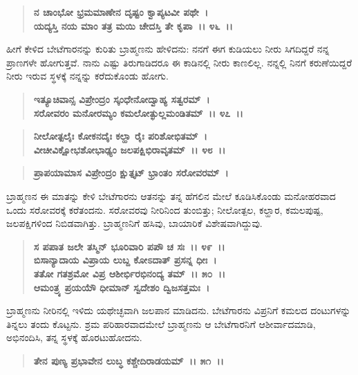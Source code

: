 \begin{verse}
\textbf{ನ ಚಾಂಭೋ ಭ್ರಮಮಾಣೇನ ದೃಷ್ಟಂ ಕ್ವಾಪ್ಯಟವೀ ಪಥೇ~।}\\\textbf{ಯದ್ಯಸ್ತಿ ನಯ ಮಾಂ ತತ್ರ ಮಯಿ ಚೇದಸ್ತಿ ತೇ ಕೃಪಾ~।। ೪೬~।।}
\end{verse}

ಹೀಗೆ ಕೇಳಿದ ಬೇಟೆಗಾರನನ್ನು ಕುರಿತು ಬ್ರಾಹ್ಮಣನು ಹೇಳಿದನು: ನನಗೆ ಈಗ ಕುಡಿಯಲು ನೀರು ಸಿಗದಿದ್ದರೆ ನನ್ನ ಪ್ರಾಣಗಳೇ ಹೋಗುತ್ತವೆ. ನಾನು ಎಷ್ಟು ತಿರುಗಾಡಿದರೂ ಈ ಕಾಡಿನಲ್ಲಿ ನೀರು ಕಾಣಲಿಲ್ಲ. ನನ್ನಲ್ಲಿ ನಿನಗೆ ಕರುಣೆಯಿದ್ದರೆ ನೀರು ಇರುವ ಸ್ಥಳಕ್ಕೆ ನನ್ನನ್ನು ಕರೆದುಕೊಂಡು ಹೋಗು.

\begin{verse}
\textbf{ಇತ್ಯೂಚಿವಾನ್ಸ ವಿಪ್ರೇಂದ್ರಂ ಸ್ಕಂಧೇನೋದ್ವಾಹ್ಯ ಸತ್ವರಮ್~।}\\\textbf{ಸರೋವರಂ ಮನೋರಮ್ಯಂ ಕಮಲೋತ್ಫುಲ್ಲಮಂಡಿತಮ್~।। ೪೭~।। }
\end{verse}

\begin{verse}
\textbf{ನೀಲೋತ್ಪಲೈಃ ಕೋಕನದೈಃ ಕಲ್ಹಾ ರೈಃ ಪರಿಶೋಭಿತಮ್~।}\\\textbf{ವೀಚೀವಿಕ್ಷೋಭಶೋಭಾಢ್ಯಂ ಜಲಪಕ್ಷಿಭಿರಾವೃತಮ್~।। ೪೮~।। }
\end{verse}

\begin{verse}
\textbf{ಪ್ರಾಪಯಾಮಾಸ ವಿಪ್ರೇಂದ್ರಂ ಕ್ಷುತ್ತೃಟ್ ಭ್ರಾಂತಂ ಸರೋವರಮ್~।}
\end{verse}

ಬ್ರಾಹ್ಮಣನ ಈ ಮಾತನ್ನು ಕೇಳಿ ಬೇಟೆಗಾರನು ಆತನನ್ನು ತನ್ನ ಹೆಗಲಿನ ಮೇಲೆ ಕೂಡಿಸಿಕೊಂಡು ಮನೋಹರವಾದ ಒಂದು ಸರೋವರಕ್ಕೆ ಕರೆತಂದನು. ಸರೋವರವು ನೀರಿನಿಂದ ತುಂಬಿತ್ತು; ನೀಲೋತ್ಪಲ, ಕಲ್ಹಾರ, ಕಮಲಪುಷ್ಪ, ಜಲಪಕ್ಷಿಗಳಿಂದ ನಿಬಿಡವಾಗಿತ್ತು. ಬ್ರಾಹ್ಮಣನಿಗೆ ಹಸಿವು, ಬಾಯಾರಿಕೆ ವಿಶೇಷವಾಗಿದ್ದುವು.

\begin{verse}
\textbf{ಸ ಪಪಾತ ಜಲೇ ತಸ್ಮಿನ್ ಭೂರಿವಾರಿ ಪಪೌ ಚ ಸಃ~।। ೪೯~।।} \\\textbf{ಬಿಸಾನ್ಯಾದಾಯ ವಿಪ್ರಾಯ ಲುಬ್ದ ಕೋಽದಾತ್ ಪ್ರಸನ್ನ ಧೀಃ~।}\\\textbf{ತತೋ ಗತಶ್ರಮೋ ವಿಪ್ರ ಆಶೀರ್ಭಿರಭಿನಂದ್ಯ ತಮ್~।। ೫೦~।। }\\\textbf{ಆಮಂತ್ರ್ಯ ಪ್ರಯಯೆೌ ಧೀಮಾನ್ ಸ್ವದೇಶಂ ದ್ವಿಜಸತ್ತಮಃ~।}
\end{verse}

ಬ್ರಾಹ್ಮಣನು ನೀರಿನಲ್ಲಿ ಇಳಿದು ಯಥೇಚ್ಛವಾಗಿ ಜಲಪಾನ ಮಾಡಿದನು. ಬೇಟೆಗಾರನು ವಿಪ್ರನಿಗೆ ಕಮಲದ ದಂಟುಗಳನ್ನು ತಿನ್ನಲು ತಂದು ಕೊಟ್ಟನು. ಶ್ರಮ ಪರಿಹಾರವಾದಮೇಲೆ ಬ್ರಾಹ್ಮಣನು ಆ ಬೇಟೆಗಾರನಿಗೆ ಆಶೀರ್ವಾದಮಾಡಿ, ಅಭಿನಂದಿಸಿ, ತನ್ನ ಸ್ಥಳಕ್ಕೆ ಹೊರಟು\-ಹೋದನು.

\begin{verse}
\textbf{ತೇನ ಪುಣ್ಯ ಪ್ರಭಾವೇನ ಲುಬ್ಧ ಕಶ್ಚೇದಿರಾಡಯಮ್~।। ೫೧~।।}
\end{verse}

